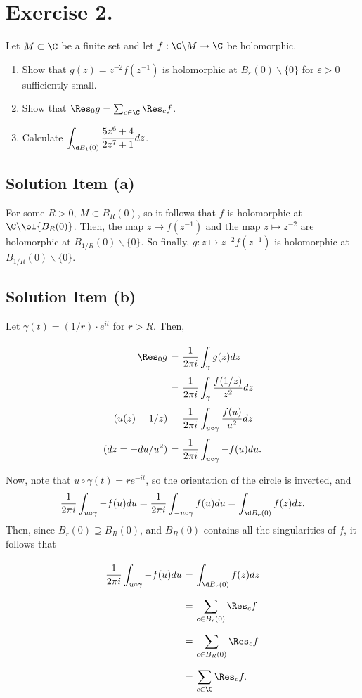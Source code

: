 \section*{Exercise 2.}

Let $M \subset \C$ be a finite set and let $f:\C\backslash M \to \C$ be holomorphic.
\begin{enumerate}[label=(\alph*)]
    \item Show that $g(z) = z^{-2} f(z^{-1})$ is holomorphic at $B_\varepsilon(0)\backslash\{0\}$ for $\varepsilon > 0$ sufficiently small.
    \item Show that $\Res_0 g = \sum_{c\in \C} \Res_c f$.
    \item Calculate $\displaystyle \int_{\d B_1(0)} \frac{5z^6 + 4}{2z^7 + 1} dz$.
\end{enumerate}

\subsection*{Solution Item (a)}

For some $R > 0$, $M \subset B_R(0)$, so it follows that $f$ is holomorphic at $\C \backslash \ol{B_R(0)}$. Then, the map $z \mapsto f(z^{-1})$ and the map $z \mapsto z^{-2}$ are holomorphic at $B_{1/R}(0)\backslash \{0\}$. So finally, $g: z \mapsto z^{-2}f(z^{-1})$ is holomorphic at $B_{1/R}(0)\backslash \{0\}$.

\subsection*{Solution Item (b)}

Let $\gamma(t) = (1/r) \cdot e^{i t}$ for $r > R$. Then,
\[ \everymath{\displaystyle}
\arraycolsep=1.8pt\def\arraystretch{2.5}
\begin{array}{rcl}
    \Res_0 g & = & \frac{1}{2\pi i} \int_\gamma g(z) dz\\
    & = & \frac{1}{2\pi i} \int_\gamma \frac{f(1/z)}{z^2} dz\\
    (u(z) = 1/z) & = & \frac{1}{2\pi i} \int_{u\circ \gamma} \frac{f(u)}{u^2} dz\\
    (dz = -du/u^2) & = & \frac{1}{2\pi i} \int_{u\circ \gamma} -f(u) du.
\end{array}\]

Now, note that $u\circ \gamma(t) = r e^{-it}$, so the orientation of the circle is inverted, and
\[ \frac{1}{2\pi i} \int_{u\circ \gamma} -f(u) du = \frac{1}{2\pi i} \int_{-u\circ \gamma} f(u) du = \int_{\d B_r(0)} f(z) dz. \]
Then, since $B_r(0) \supseteq B_R(0)$, and $B_R(0)$ contains all the singularities of $f$, it follows that 
\[ \everymath{\displaystyle}
\arraycolsep=1.8pt\def\arraystretch{2.5}
\begin{array}{rcl}
    \frac{1}{2\pi i} \int_{u\circ \gamma} -f(u) du & = & \int_{\d B_r(0)} f(z) dz\\
    & = & \sum_{c \in B_r(0)} \Res_c f\\
    & = & \sum_{c \in B_R(0)} \Res_c f\\
    & = & \sum_{c \in \C} \Res_c f.
\end{array} \]



